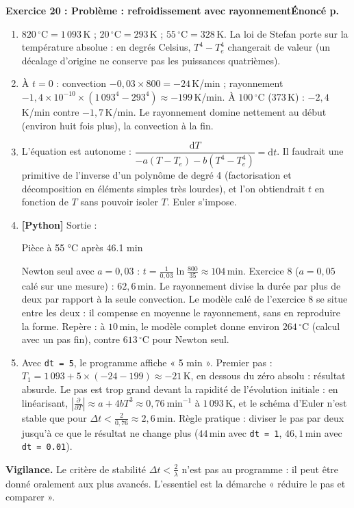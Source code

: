 \documentclass[a4paper,11pt]{article}
\newcommand{\cor}[2]{\needspace{8\baselineskip}\vspace{8pt}%
\begin{tcolorbox}[colback=uimmlightblue, colframe=uimmblue, boxrule=0.8pt, arc=2pt, left=6pt, right=6pt, top=3pt, bottom=3pt]
{\color{uimmblue}\bfseries Exercice #1 : #2}\hfill{\small\color{uimmred}\bfseries Énoncé p.~\pageref*{E-exo:#1}}
\end{tcolorbox}}
\newcommand{\vig}[1]{\par{\small\color{uimmred}\textbf{Vigilance.} #1}\par}
\newcommand{\py}{{\color{uimmred}\small\bfseries[Python]}}
\newenvironment{sortie}{\par\begin{tcolorbox}[colback=uimmlightgray, colframe=uimmgray, boxrule=0.5pt, arc=1pt, left=6pt, top=2pt, bottom=2pt, fontupper=\ttfamily\small]}{\end{tcolorbox}}
\newcommand{\dd}{\mathrm{d}}
\begin{document}
\cor{20}{Problème : refroidissement avec rayonnement}
\begin{enumerate}
\item $820\,^\circ\text{C} = 1\,093$\,K ; $20\,^\circ\text{C} = 293$\,K ; $55\,^\circ\text{C} = 328$\,K. La loi de Stefan porte sur la température absolue : en degrés Celsius, $T^4 - T_e^4$ changerait de valeur (un décalage d'origine ne conserve pas les puissances quatrièmes).
\item À $t = 0$ : convection $-0{,}03 \times 800 = -24$\,K/min ; rayonnement $-1{,}4\times10^{-10}\times(1\,093^4 - 293^4) \approx -199$\,K/min. À $100\,^\circ$C ($373$\,K) : $-2{,}4$\,K/min contre $-1{,}7$\,K/min. Le rayonnement domine nettement au début (environ huit fois plus), la convection à la fin.
\item L'équation est autonome : $\dfrac{\dd T}{-a(T - T_e) - b(T^4 - T_e^4)} = \dd t$. Il faudrait une primitive de l'inverse d'un polynôme de degré 4 (factorisation et décomposition en éléments simples très lourdes), et l'on obtiendrait $t$ en fonction de $T$ sans pouvoir isoler $T$. Euler s'impose.
\item \py{} Sortie :
\begin{sortie}
Pièce à 55 °C après 46.1 min
\end{sortie}
Newton seul avec $a = 0{,}03$ : $t = \frac{1}{0{,}03}\ln\frac{800}{35} \approx 104$\,min. Exercice 8 ($a = 0{,}05$ calé sur une mesure) : $62{,}6$\,min. Le rayonnement divise la durée par plus de deux par rapport à la seule convection. Le modèle calé de l'exercice 8 se situe entre les deux : il compense en moyenne le rayonnement, sans en reproduire la forme. Repère : à $10$\,min, le modèle complet donne environ $264\,^\circ$C (calcul avec un pas fin), contre $613\,^\circ$C pour Newton seul.
\item Avec \texttt{dt = 5}, le programme affiche « 5 min ». Premier pas : $T_1 = 1\,093 + 5 \times (-24 - 199) \approx -21$\,K, en dessous du zéro absolu : résultat absurde. Le pas est trop grand devant la rapidité de l'évolution initiale : en linéarisant, $\left|\frac{\partial}{\partial T}\right| \approx a + 4bT^3 \approx 0{,}76\ \text{min}^{-1}$ à $1\,093$\,K, et le schéma d'Euler n'est stable que pour $\Delta t < \frac{2}{0{,}76} \approx 2{,}6$\,min. Règle pratique : diviser le pas par deux jusqu'à ce que le résultat ne change plus ($44$\,min avec \texttt{dt = 1}, $46{,}1$\,min avec \texttt{dt = 0.01}).
\end{enumerate}
\vig{Le critère de stabilité $\Delta t < \frac{2}{\lambda}$ n'est pas au programme : il peut être donné oralement aux plus avancés. L'essentiel est la démarche « réduire le pas et comparer ».}
\end{document}
